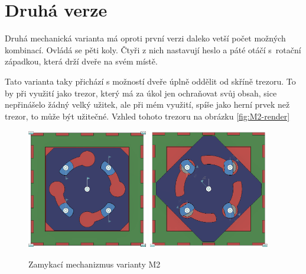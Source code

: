 \section{Druhá verze}

Druhá mechanická varianta má oproti první verzi daleko vetší počet možných kombinací.
Ovládá se pěti koly. Čtyři z nich nastavují heslo a páté otáčí s~rotační západkou, která drží dveře na svém místě.

Tato varianta taky přichází s možností dveře úplně oddělit od skříně trezoru. To by při využití jako trezor, který
má za úkol jen ochraňovat svůj obsah, sice nepřinášelo žádný velký užitek, ale při mém využití, spíše jako herní 
prvek než trezor, to může být užitečné. Vzhled tohoto trezoru na obrázku \ref{fig:M2-render}

\begin{figure}[htbp]
    \centering
    \includegraphics[width=150pt]{kapitoly/obrazky/M2/mechanizmus_odemcen.png}
    \includegraphics[width=150pt]{kapitoly/obrazky/M2/mechanizmus_zamceno.png}
    \caption{Zamykací mechanizmus varianty M2}
    \label{fig:M2-mechanizmus}
\end{figure}

\newpage